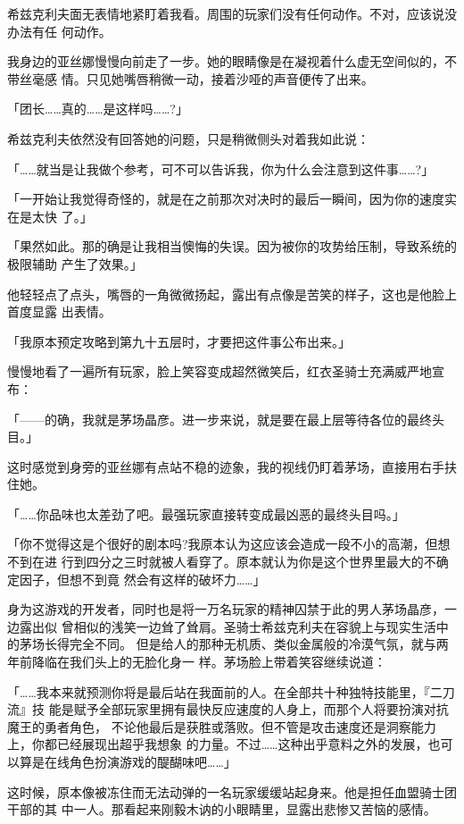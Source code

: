 \documentclass[11pt]{book}
\begin{document}
希兹克利夫面无表情地紧盯着我看。周围的玩家们没有任何动作。不对，应该说没办法有任
何动作。

我身边的亚丝娜慢慢向前走了一步。她的眼睛像是在凝视着什么虚无空间似的，不带丝毫感
情。只见她嘴唇稍微一动，接着沙哑的声音便传了出来。

「团长……真的……是这样吗……?」

希兹克利夫依然没有回答她的问题，只是稍微侧头对着我如此说：

「……就当是让我做个参考，可不可以告诉我，你为什么会注意到这件事……?」

「一开始让我觉得奇怪的，就是在之前那次对决时的最后一瞬间，因为你的速度实在是太快
了。」

「果然如此。那的确是让我相当懊悔的失误。因为被你的攻势给压制，导致系统的极限辅助
产生了效果。」

他轻轻点了点头，嘴唇的一角微微扬起，露出有点像是苦笑的样子，这也是他脸上首度显露
出表情。

「我原本预定攻略到第九十五层时，才要把这件事公布出来。」

慢慢地看了一遍所有玩家，脸上笑容变成超然微笑后，红衣圣骑士充满威严地宣布：

「——的确，我就是茅场晶彦。进一步来说，就是要在最上层等待各位的最终头目。」

这时感觉到身旁的亚丝娜有点站不稳的迹象，我的视线仍盯着茅场，直接用右手扶住她。

「……你品味也太差劲了吧。最强玩家直接转变成最凶恶的最终头目吗。」

「你不觉得这是个很好的剧本吗?我原本认为这应该会造成一段不小的高潮，但想不到在进
行到四分之三时就被人看穿了。原本就认为你是这个世界里最大的不确定因子，但想不到竟
然会有这样的破坏力……」

身为这游戏的开发者，同时也是将一万名玩家的精神囚禁于此的男人茅场晶彦，一边露出似
曾相似的浅笑一边耸了耸肩。圣骑士希兹克利夫在容貌上与现实生活中的茅场长得完全不同。
但是给人的那种无机质、类似金属般的冷漠气氛，就与两年前降临在我们头上的无脸化身一
样。茅场脸上带着笑容继续说道：

「……我本来就预测你将是最后站在我面前的人。在全部共十种独特技能里，『二刀流』技
能是赋予全部玩家里拥有最快反应速度的人身上，而那个人将要扮演对抗魔王的勇者角色，
不论他最后是获胜或落败。但不管是攻击速度还是洞察能力上，你都已经展现出超乎我想象
的力量。不过……这种出乎意料之外的发展，也可以算是在线角色扮演游戏的醍醐味吧……」

这时候，原本像被冻住而无法动弹的一名玩家缓缓站起身来。他是担任血盟骑士团干部的其
中一人。那看起来刚毅木讷的小眼睛里，显露出悲惨又苦恼的感情。
\end{document}
